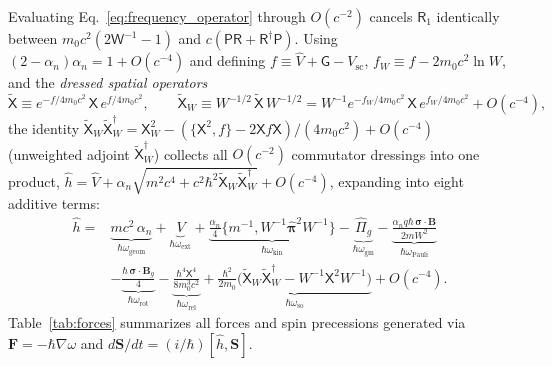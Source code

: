 \documentclass[aps,prd,onecolumn,tightenlines,nofootinbib,notitlepage,10pt,floatfix]{revtex4-2}
\theoremstyle{indentedtheorem}
\begin{document}
Evaluating Eq.~\eqref{eq:frequency_operator} through $O(c^{-2})$ cancels $\mathsf{R}_1$ identically between $m_0 c^2(2\mathsf{W}^{-1}-1)$ and $c(\mathsf{P}\mathsf{R}+\mathsf{R}^\dagger\mathsf{P})$. Using $(2-\alpha_n)\alpha_n=1+O(c^{-4})$ and defining $f\equiv\hat{V}+\mathsf{G}-V_\text{sc}$, $f_W\equiv f-2m_0 c^2\ln W$, and the \emph{dressed spatial operators}
\begin{equation}
    \tilde{\mathsf{X}} \equiv e^{-f/4m_0 c^2}\,\mathsf{X}\,e^{f/4m_0 c^2} , \qquad \tilde{\mathsf{X}}_W \equiv W^{-1/2}\,\tilde{\mathsf{X}}\,W^{-1/2} = W^{-1}e^{-f_W/4m_0 c^2}\,\mathsf{X}\,e^{f_W/4m_0 c^2} + O(c^{-4}) ,
    \label{eq:dressed_X}
\end{equation}
the identity $\tilde{\mathsf{X}}_W\tilde{\mathsf{X}}_W^\dagger=\mathsf{X}_W^2-(\{\mathsf{X}^2,f\}-2\mathsf{X}f\mathsf{X})/(4m_0 c^2)+O(c^{-4})$ (unweighted adjoint $\tilde{\mathsf{X}}_W^\dagger$) collects all $O(c^{-2})$ commutator dressings into one product, $\hat{h}=\hat{V}+\alpha_n\sqrt{m^2 c^4+c^2\hbar^2\tilde{\mathsf{X}}_W\tilde{\mathsf{X}}_W^\dagger}+O(c^{-4})$, expanding into eight additive terms:
\begin{equation}
    \boxed{\begin{aligned}
    \hat{h} = {} & \underbrace{mc^2\,\alpha_n}_{\hbar\omega_\text{geom}} + \underbrace{V}_{\hbar\omega_\text{ext}} + \underbrace{\frac{\alpha_n}{4}\big\{m^{-1},W^{-1}\hat{\boldsymbol{\pi}}^2 W^{-1}\big\}}_{\hbar\omega_\text{kin}} - \underbrace{\hat{\Pi}_g}_{\hbar\omega_\text{gm}} - \underbrace{\frac{\alpha_n q\hbar\,\boldsymbol{\sigma}\cdot\mathbf{B}}{2mW^2}}_{\hbar\omega_\text{Pauli}} \\
    & - \underbrace{\frac{\hbar\,\boldsymbol{\sigma}\cdot\mathbf{B}_g}{4}}_{\hbar\omega_\text{rot}} - \underbrace{\frac{\hbar^4\mathsf{X}^4}{8m_0^3 c^2}}_{\hbar\omega_\text{rel}} + \underbrace{\frac{\hbar^2}{2m_0}\big(\tilde{\mathsf{X}}_W\tilde{\mathsf{X}}_W^\dagger - W^{-1}\mathsf{X}^2 W^{-1}\big)}_{\hbar\omega_\text{so}} + O(c^{-4}) .
    \end{aligned}}
    \label{eq:nr_expansion}
\end{equation}
Table~\ref{tab:forces} summarizes all forces and spin precessions generated via $\mathbf{F}=-\hbar\nabla\omega$ and $d\mathbf{S}/dt=(i/\hbar)[\hat{h},\mathbf{S}]$.
\end{document}
